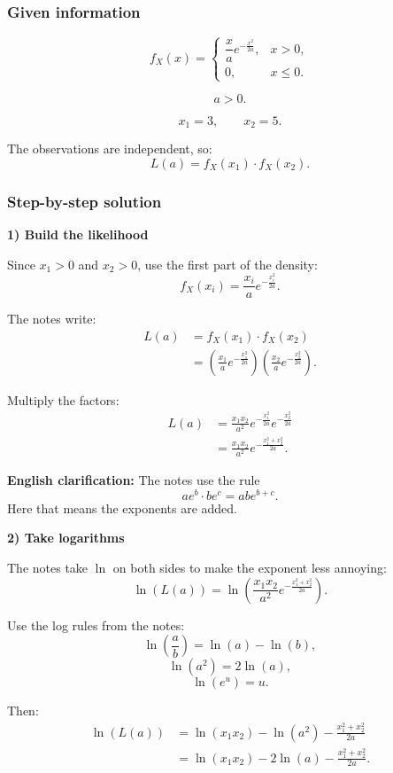 \documentclass[10pt]{article}
\begin{document}
\subsubsection*{Given information}

\[
f_X(x)=
\begin{cases}
\dfrac{x}{a}
e^{-\frac{x^2}{2a}},
& x>0,\\
0,
& x\le 0.
\end{cases}
\]

\[
a>0.
\]

\[
x_1=3,
\qquad
x_2=5.
\]

The observations are independent, so:
\[
L(a)=f_X(x_1)\cdot f_X(x_2).
\]

\subsubsection*{Step-by-step solution}

\textbf{1) Build the likelihood}

Since \(x_1>0\) and \(x_2>0\), use the first part of
the density:
\[
f_X(x_i)
=
\frac{x_i}{a}
e^{-\frac{x_i^2}{2a}}.
\]

The notes write:
\begin{align*}
L(a)
&=
f_X(x_1)\cdot f_X(x_2)
\\[2mm]
&=
\left(
\frac{x_1}{a}
e^{-\frac{x_1^2}{2a}}
\right)
\left(
\frac{x_2}{a}
e^{-\frac{x_2^2}{2a}}
\right).
\end{align*}

Multiply the factors:
\begin{align*}
L(a)
&=
\frac{x_1x_2}{a^2}
e^{-\frac{x_1^2}{2a}}
e^{-\frac{x_2^2}{2a}}
\\[2mm]
&=
\frac{x_1x_2}{a^2}
e^{
-\frac{x_1^2+x_2^2}{2a}
}.
\end{align*}

\textbf{English clarification:}
The notes use the rule
\[
a e^b\cdot b e^c
=ab e^{b+c}.
\]
Here that means the exponents are added.

\textbf{2) Take logarithms}

The notes take \(\ln\) on both sides to make the
exponent less annoying:
\[
\ln(L(a))
=
\ln\left(
\frac{x_1x_2}{a^2}
e^{
-\frac{x_1^2+x_2^2}{2a}
}
\right).
\]

Use the log rules from the notes:
\[
\ln\left(\frac{a}{b}\right)
=
\ln(a)-\ln(b),
\]
\[
\ln(a^2)=2\ln(a),
\]
\[
\ln(e^u)=u.
\]

Then:
\begin{align*}
\ln(L(a))
&=
\ln(x_1x_2)
-
\ln(a^2)
-
\frac{x_1^2+x_2^2}{2a}
\\[2mm]
&=
\ln(x_1x_2)
-
2\ln(a)
-
\frac{x_1^2+x_2^2}{2a}.
\end{align*}
\end{document}
